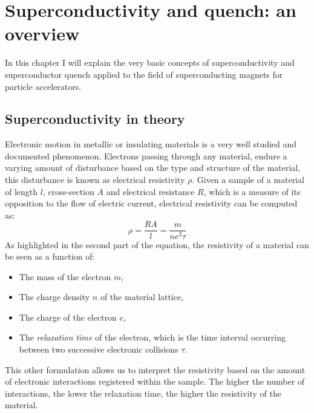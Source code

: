 \chapter{Superconductivity and quench: an overview}
\label{chp:soupcond-quench}
In this chapter I will explain the very basic concepts of superconductivity and
superconductor quench applied to the field of superconducting magnets for particle accelerators.
\section{Superconductivity in theory}
\label{sec:soupcond}
Electronic motion in metallic or insulating materials is a very well studied and documented
phenomenon. Electrons passing through any material, endure a varying amount of disturbance based on
the type and structure of the material, this disturbance is known as electrical resistivity $\rho$. Given a
sample of a material of length $l$, cross-section $A$ and electrical resistance $R$, which is a
measure of its opposition to the flow of electric current, electrical resistivity can be computed
as:
\begin{equation}
	\label{eq:resistivity-cable}
	\rho = \frac{RA}{l} = \frac{m}{ne^2\tau}
\end{equation}
As highlighted in the second part of the equation, the resistivity of a material can be seen as a function of:
\begin{itemize}
	\item The mass of the electron $m$,
	\item The charge density $n$ of the material lattice,
	\item The charge of the electron $e$,
	\item The \emph{relaxation time} of the electron, which is the time interval occurring between two
	      successive electronic collisions $\tau$.
\end{itemize}
This other formulation allows us to interpret the resistivity based on the amount of electronic
interactions registered within the sample. The higher the number of interactions, the lower the
relaxation time, the higher the resistivity of the material.

